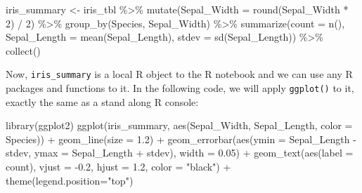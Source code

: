 \documentclass[
  12pt,
]{krantz}
\makeatletter
\newenvironment{Shaded}{\begin{snugshade}}{\end{snugshade}}
\newcommand{\AttributeTok}[1]{\textcolor[rgb]{0.61,0.61,0.61}{#1}}
\newcommand{\DecValTok}[1]{\textcolor[rgb]{0.06,0.06,0.06}{#1}}
\newcommand{\FloatTok}[1]{\textcolor[rgb]{0.06,0.06,0.06}{#1}}
\newcommand{\FunctionTok}[1]{\textcolor[rgb]{0,0,0}{#1}}
\newcommand{\NormalTok}[1]{#1}
\newcommand{\OtherTok}[1]{\textcolor[rgb]{0.37,0.37,0.37}{#1}}
\newcommand{\SpecialCharTok}[1]{\textcolor[rgb]{0,0,0}{#1}}
\newcommand{\StringTok}[1]{\textcolor[rgb]{0.5,0.5,0.5}{#1}}
\newenvironment{kframe}{%
\medskip{}
\setlength{\fboxsep}{.8em}
 \def\at@end@of@kframe{}%
 \ifinner\ifhmode%
  \def\at@end@of@kframe{\end{minipage}}%
  \begin{minipage}{\columnwidth}%
 \fi\fi%
 \def\FrameCommand##1{\hskip\@totalleftmargin \hskip-\fboxsep
 \colorbox{shadecolor}{##1}\hskip-\fboxsep
     \hskip-\linewidth \hskip-\@totalleftmargin \hskip\columnwidth}%
 \MakeFramed {\advance\hsize-\width
   \@totalleftmargin\z@ \linewidth\hsize
   \@setminipage}}%
 {\par\unskip\endMakeFramed%
 \at@end@of@kframe}
\renewenvironment{Shaded}{\begin{kframe}}{\end{kframe}}
\makeatother
\begin{document}
\begin{Shaded}
\begin{Highlighting}[]
\NormalTok{iris\_summary }\OtherTok{\textless{}{-}}\NormalTok{ iris\_tbl }\SpecialCharTok{\%\textgreater{}\%}
  \FunctionTok{mutate}\NormalTok{(}\AttributeTok{Sepal\_Width =} \FunctionTok{round}\NormalTok{(Sepal\_Width }\SpecialCharTok{*} \DecValTok{2}\NormalTok{) }\SpecialCharTok{/} \DecValTok{2}\NormalTok{) }\SpecialCharTok{\%\textgreater{}\%}
  \FunctionTok{group\_by}\NormalTok{(Species, Sepal\_Width) }\SpecialCharTok{\%\textgreater{}\%}
  \FunctionTok{summarize}\NormalTok{(}\AttributeTok{count =} \FunctionTok{n}\NormalTok{(), }
              \AttributeTok{Sepal\_Length =} \FunctionTok{mean}\NormalTok{(Sepal\_Length), }
              \AttributeTok{stdev =} \FunctionTok{sd}\NormalTok{(Sepal\_Length)) }\SpecialCharTok{\%\textgreater{}\%}
  \FunctionTok{collect}\NormalTok{()}
\end{Highlighting}
\end{Shaded}

Now, \texttt{iris\_summary} is a local R object to the R notebook and we can use any R packages and functions to it. In the following code, we will apply \texttt{ggplot()} to it, exactly the same as a stand along R console:

\begin{Shaded}
\begin{Highlighting}[]
\FunctionTok{library}\NormalTok{(ggplot2)}
\FunctionTok{ggplot}\NormalTok{(iris\_summary, }\FunctionTok{aes}\NormalTok{(Sepal\_Width, Sepal\_Length, }
                         \AttributeTok{color =}\NormalTok{ Species)) }\SpecialCharTok{+}
  \FunctionTok{geom\_line}\NormalTok{(}\AttributeTok{size =} \FloatTok{1.2}\NormalTok{) }\SpecialCharTok{+}
  \FunctionTok{geom\_errorbar}\NormalTok{(}\FunctionTok{aes}\NormalTok{(}\AttributeTok{ymin =}\NormalTok{ Sepal\_Length }\SpecialCharTok{{-}}\NormalTok{ stdev, }
                    \AttributeTok{ymax =}\NormalTok{ Sepal\_Length }\SpecialCharTok{+}\NormalTok{ stdev), }
                    \AttributeTok{width =} \FloatTok{0.05}\NormalTok{) }\SpecialCharTok{+}
  \FunctionTok{geom\_text}\NormalTok{(}\FunctionTok{aes}\NormalTok{(}\AttributeTok{label =}\NormalTok{ count), }\AttributeTok{vjust =} \SpecialCharTok{{-}}\FloatTok{0.2}\NormalTok{, }\AttributeTok{hjust =} \FloatTok{1.2}\NormalTok{, }
            \AttributeTok{color =} \StringTok{"black"}\NormalTok{) }\SpecialCharTok{+}
  \FunctionTok{theme}\NormalTok{(}\AttributeTok{legend.position=}\StringTok{"top"}\NormalTok{)}
\end{Highlighting}
\end{Shaded}
\end{document}
